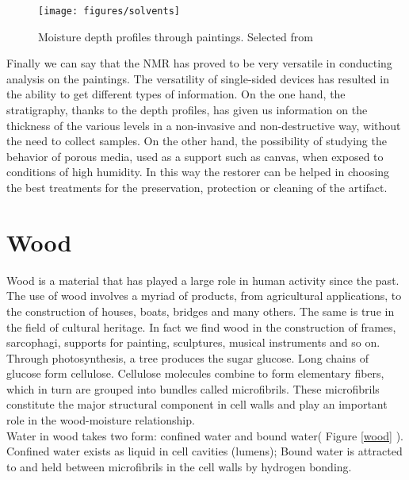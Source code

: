 \documentclass[a4paper,11pt]{report}
\begin{document}
\begin{figure}[h]
	\centering
	\texttt{[image: figures/solvents]}
	\caption{Moisture depth profiles through paintings. Selected from \cite{exseifresco}}\label{solvents}
\end{figure}

Finally we can say that the NMR has proved to be very versatile in conducting analysis on the paintings. The versatility of single-sided devices has resulted in the ability to get different types of information. On the one hand, the stratigraphy, thanks to the depth profiles, has given us information on the thickness of the various levels in a non-invasive and non-destructive way, without the need to collect samples. On the other hand, the possibility of studying the behavior of porous media, used as a support such as canvas, when exposed to conditions of high humidity. In this way the restorer can be helped in choosing the best treatments for the preservation, protection or cleaning of the artifact.






\section{Wood}

Wood is a material that has played a large role in human activity since the past. The use of wood involves a myriad of products, from agricultural applications, to the construction of houses, boats, bridges and many others. The same is true in the field of cultural heritage. In fact we find wood in the construction of frames, sarcophagi, supports for painting, sculptures, musical instruments and so on.\\
Through photosynthesis, a tree produces the sugar glucose. Long chains of glucose form cellulose. Cellulose molecules combine to form elementary fibers, which in turn are grouped into bundles called microfibrils. These microfibrils constitute the major structural component in cell walls and play an important role in the wood-moisture relationship\cite{duewood}.\\
Water in wood takes two form: confined water and bound water( Figure \ref{wood} ). Confined water exists as liquid in cell cavities (lumens); Bound water is attracted to and held between microfibrils in the cell walls by hydrogen bonding\cite{duewood}.
\end{document}
